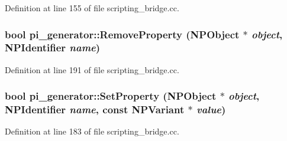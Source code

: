 Definition at line 155 of file scripting\_\-bridge.cc.

\hypertarget{namespacepi__generator_ae5666fa423e3664b2c082f0e8b2fcfd4}{
\subsubsection[{RemoveProperty}]{\setlength{\rightskip}{0pt plus 5cm}bool pi\_\-generator::RemoveProperty (NPObject $\ast$ {\em object}, \/  NPIdentifier {\em name})}}
\label{namespacepi__generator_ae5666fa423e3664b2c082f0e8b2fcfd4}


Definition at line 191 of file scripting\_\-bridge.cc.

\hypertarget{namespacepi__generator_a54b3ed1c0ca9069974a0a575680896c9}{
\subsubsection[{SetProperty}]{\setlength{\rightskip}{0pt plus 5cm}bool pi\_\-generator::SetProperty (NPObject $\ast$ {\em object}, \/  NPIdentifier {\em name}, \/  const NPVariant $\ast$ {\em value})}}
\label{namespacepi__generator_a54b3ed1c0ca9069974a0a575680896c9}


Definition at line 183 of file scripting\_\-bridge.cc.

